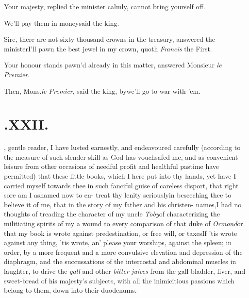 \documentclass[twoside]{article}
\begin{document}
Your majesty, replied the minister\break
calmly, cannot bring yourself off.

We’ll pay them in money\tsh said the king.

Sire, there are not sixty thousand\break
crowns in the treasury, answered the\break
minister\tsh I’ll pawn the best jewel
in my crown, quoth \textit{Francis} the First.

Your honour stands pawn’d already\break
in this matter, answered Monsieur \textit{le Premier}.

Then, Mons.\@ \textit{le Premier}, said the king,
by\tsh we’ll go to war with ’em.

\baselineskip

\section{.\enspace XXII.}

, gentle reader, I have\break
lusted earnestly, and endeavoured\break
carefully (according to the measure of such slender skill
as God has vouchsafed me, and as convenient leisure from
other occasions of needful profit and healthful pastime have
permitted) that these little books, which I here put into thy
hands,
\break
\tsk yet have I carried myself towards thee\break
in such fanciful guise of careless disport,\break
that right sore am I ashamed now to en-\break
{}\hbox{t}\sic reat thy lenity seriously\tsk in beseeching thee to
believe it of me, that in the\break
story of my father and his christen-\break 
names,\tsk I had no thoughts of treading 
the character of my uncle \textit{Toby}\tsk of cha\-racterizing
the militiating spirits of my  a wound to every comparison of that 
duke of \textit{Ormond}\tsk or that my book is wrote against
predestination, or free will, or taxes\tsk If ’tis wrote
against any thing,\break
\tsh ’tis wrote, an’ please your worships,
against the spleen; in order, by a more
frequent and a more convulsive elevation and depression of
the diaphragm, and the succussations of the intercostal and
abdominal muscles in laughter, to drive the \textit{gall}
and other \textit{bitter juices} from the gall bladder,
liver, and sweet-bread of his majesty’s subjects, with all
the inimicitious passions which belong to them,\break
down into their duodenums.
\end{document}
